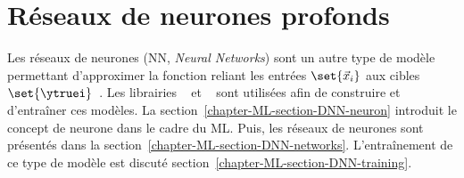 \section{Réseaux de neurones profonds}\label{chapter-ML-section-DNN}
Les réseaux de neurones (NN, \emph{Neural Networks}) sont un autre type de modèle permettant d'approximer la fonction reliant les entrées $\set{\vec{x}_i}$ aux cibles $\set{\ytruei}$~\cite{Sarle1994NeuralNA,DNN}.
Les librairies
\KERAS~\cite{keras}
et
\TENSORFLOW~\cite{tensorflow}
sont utilisées afin de construire et d'entraîner ces modèles.
La section~\ref{chapter-ML-section-DNN-neuron} introduit le concept de neurone dans le cadre du ML.
Puis, les réseaux de neurones sont présentés dans la section~\ref{chapter-ML-section-DNN-networks}.
L'entraînement de ce type de modèle est discuté section~\ref{chapter-ML-section-DNN-training}.



